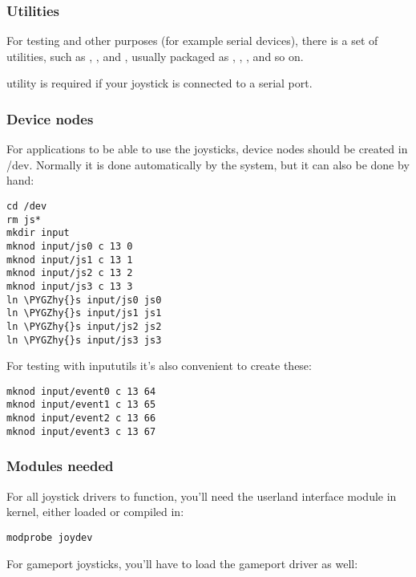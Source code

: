 \documentclass[a4paper,8pt,english]{sphinxmanual}
\def\PYGZhy{\char`\-}
\begin{document}
\subsubsection{Utilities}
\label{input/joydev/joystick:utilities}
For testing and other purposes (for example serial devices), there is a set
of utilities, such as , , and ,
usually packaged as , , , and so on.

 utility is required if your joystick is connected to a
serial port.


\subsubsection{Device nodes}
\label{input/joydev/joystick:device-nodes}
For applications to be able to use the joysticks, device nodes should be
created in /dev. Normally it is done automatically by the system, but
it can also be done by hand:

\begin{Verbatim}[commandchars=\\\{\}]
cd /dev
rm js*
mkdir input
mknod input/js0 c 13 0
mknod input/js1 c 13 1
mknod input/js2 c 13 2
mknod input/js3 c 13 3
ln \PYGZhy{}s input/js0 js0
ln \PYGZhy{}s input/js1 js1
ln \PYGZhy{}s input/js2 js2
ln \PYGZhy{}s input/js3 js3
\end{Verbatim}

For testing with inpututils it's also convenient to create these:

\begin{Verbatim}[commandchars=\\\{\}]
mknod input/event0 c 13 64
mknod input/event1 c 13 65
mknod input/event2 c 13 66
mknod input/event3 c 13 67
\end{Verbatim}


\subsubsection{Modules needed}
\label{input/joydev/joystick:modules-needed}
For all joystick drivers to function, you'll need the userland interface
module in kernel, either loaded or compiled in:

\begin{Verbatim}[commandchars=\\\{\}]
modprobe joydev
\end{Verbatim}

For gameport joysticks, you'll have to load the gameport driver as well:
\end{document}
